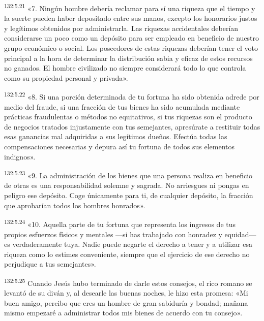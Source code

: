 \par 
\textsuperscript{132:5.21} «7. Ningún hombre debería reclamar para sí una riqueza que el tiempo y la suerte pueden haber depositado entre sus manos, excepto los honorarios justos y legítimos obtenidos por administrarla. Las riquezas accidentales deberían considerarse un poco como un depósito para ser empleado en beneficio de nuestro grupo económico o social. Los poseedores de estas riquezas deberían tener el voto principal a la hora de determinar la distribución sabia y eficaz de estos recursos no ganados. El hombre civilizado no siempre considerará todo lo que controla como su propiedad personal y privada».

\par 
\textsuperscript{132:5.22} «8. Si una porción determinada de tu fortuna ha sido obtenida adrede por medio del fraude, si una fracción de tus bienes ha sido acumulada mediante prácticas fraudulentas o métodos no equitativos, si tus riquezas son el producto de negocios tratados injustamente con tus semejantes, apresúrate a restituir todas esas ganancias mal adquiridas a sus legítimos dueños. Efectúa todas las compensaciones necesarias y depura así tu fortuna de todos sus elementos indignos».

\par 
\textsuperscript{132:5.23} «9. La administración de los bienes que una persona realiza en beneficio de otras es una responsabilidad solemne y sagrada. No arriesgues ni pongas en peligro ese depósito. Coge únicamente para ti, de cualquier depósito, la fracción que aprobarían todos los hombres honrados».

\par 
\textsuperscript{132:5.24} «10. Aquella parte de tu fortuna que representa los ingresos de tus propios esfuerzos físicos y mentales ---si has trabajado con honradez y equidad--- es verdaderamente tuya. Nadie puede negarte el derecho a tener y a utilizar esa riqueza como lo estimes conveniente, siempre que el ejercicio de ese derecho no perjudique a tus semejantes».

\par 
\textsuperscript{132:5.25} Cuando Jesús hubo terminado de darle estos consejos, el rico romano se levantó de su diván y, al desearle las buenas noches, le hizo esta promesa: «Mi buen amigo, percibo que eres un hombre de gran sabiduría y bondad; mañana mismo empezaré a administrar todos mis bienes de acuerdo con tu consejo».

